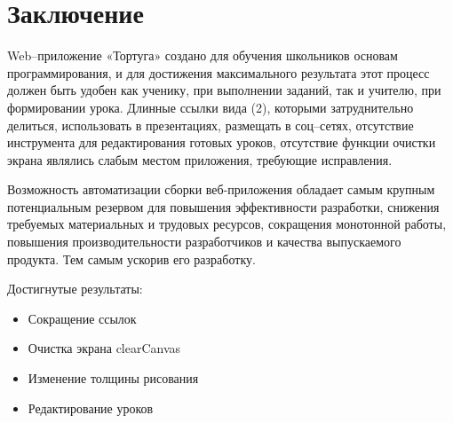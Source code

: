 \chapter*{Заключение}						%

Web–приложение «Тортуга» создано для обучения школьников основам программирования, и для достижения максимального результата этот процесс должен быть удобен как ученику, при выполнении заданий, так и учителю, при формировании урока. Длинные ссылки вида (2), которыми затруднительно делиться, использовать в презентациях, размещать в соц–сетях, отсутствие инструмента для редактирования готовых уроков, отсутствие функции очистки экрана являлись слабым местом приложения, требующие исправления.\par

Возможность  автоматизации сборки веб-приложения обладает самым крупным потенциальным резервом для повышения эффективности разработки, снижения требуемых материальных и трудовых ресурсов, сокращения монотонной работы, повышения производительности разработчиков и качества выпускаемого продукта. Тем самым ускорив его разработку.\par
\vspace{16mm}
Достигнутые результаты:
\begin{itemize}
  \item Сокращение ссылок
  \item Очистка экрана clearCanvas
  \item Изменение толщины рисования
  \item Редактирование уроков
\end{itemize}


\clearpage